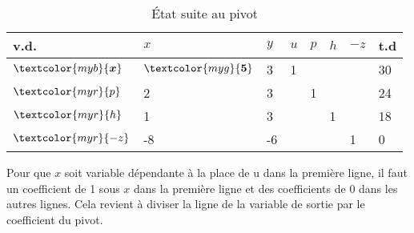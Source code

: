\documentclass{report}
\begin{document}
\begin{multicols*}{2}
        \begin{table}[H]
                \begin{center}
                    \renewcommand{\arraystretch}{1.5}
                    \selectfont
                    \footnotesize
                        \begin{tabular}{|l|l l l l l |l|l|}
                        \arrayrulecolor{blue}
                        \hline
                        v.d. & $x$
                             & $y$ & $u$ & $p$ & $h$ & $-z$ & t.d 
                        \\
                        \hline
                        \arrayrulecolor{black}
                        $\textcolor{myb}{\boldsymbol{x}} 
                        $     & $\textcolor{myg}{\boldsymbol{5}}$ 
                                & 3
                                & 1
                                & 
                                & &  &  30
                        \\
                        $\textcolor{myr}{p} $     
                               & 2
                               & 3
                               & & 1
                               & & & 24 
                        \\
                        $\textcolor{myr}{h} $     
                               & 1
                               & 3 
                               &  & 
                               &  1
                               & & 18 
                        \\ 
                        \hline
                        $\textcolor{myr}{-z}$ 
                               & -8
                                & -6
                                & 
                                & 
                                & 
                                & 1 & 0 
                        \\
                        \hline 



                        \end{tabular}
                \end{center}
        \caption{État suite au pivot}
        \end{table}
    Pour que $x$ soit \textcolor{myr}{variable dépendante } à la place de u dans la première ligne, il faut un 
    coefficient de 1 sous $x$ dans la première ligne et des coefficients de 0 dans les autres 
    lignes. Cela revient à diviser la ligne de la variable de sortie par le coefficient du pivot.


\end{multicols*}
\end{document}

